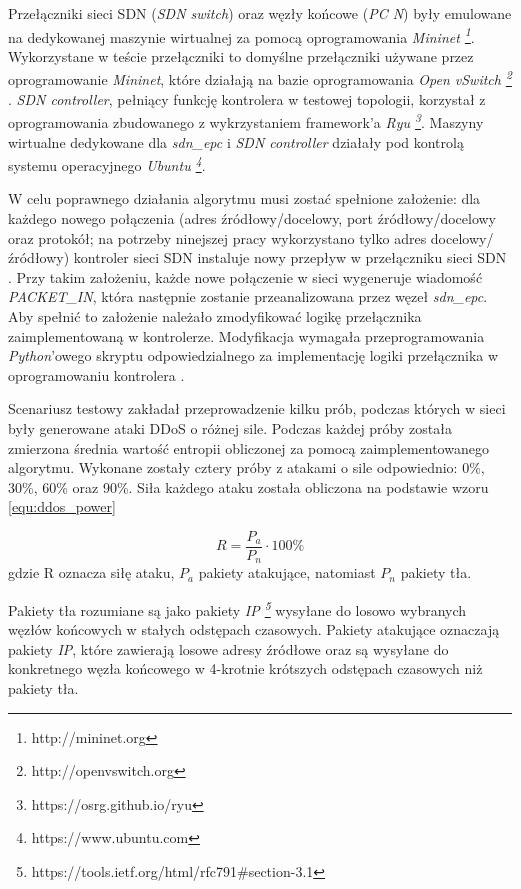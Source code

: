 Przełączniki sieci SDN (\textit{SDN switch}) oraz węzły końcowe (\textit{PC
  N}) były emulowane na dedykowanej maszynie wirtualnej za pomocą oprogramowania
\textit{Mininet \footnote{http://mininet.org}}. Wykorzystane w teście
przełączniki to domyślne przełączniki używane przez oprogramowanie
\textit{Mininet}, które działają na bazie oprogramowania
\textit{Open vSwitch \footnote{http://openvswitch.org}} \cite{mininetwiki}.
\textit{SDN controller}, pełniący funkcję kontrolera w testowej topologii,
korzystał z oprogramowania zbudowanego z wykrzystaniem framework'a
\textit{Ryu \footnote{https://osrg.github.io/ryu}}. Maszyny wirtualne dedykowane
dla \textit{sdn\_epc} i \textit{SDN controller} działały pod kontrolą systemu
operacyjnego \textit{Ubuntu \footnote{https://www.ubuntu.com}}.

W celu poprawnego działania algorytmu musi zostać spełnione założenie: dla
każdego nowego połączenia (adres źródłowy/docelowy, port źródłowy/docelowy oraz
protokół; na potrzeby ninejszej pracy wykorzystano tylko adres
docelowy/źródłowy) kontroler sieci SDN instaluje nowy przepływ w przełączniku
sieci SDN \cite{mainddosarticle}. Przy takim założeniu, każde nowe połączenie w
sieci wygeneruje wiadomość \textit{PACKET\_IN}, która następnie zostanie
przeanalizowana przez węzeł \textit{sdn\_epc}. Aby spełnić to założenie należało
zmodyfikować logikę przełącznika zaimplementowaną w kontrolerze. Modyfikacja
wymagała przeprogramowania \textit{Python}'owego skryptu odpowiedzialnego za
implementację logiki przełącznika w oprogramowaniu kontrolera \cite{ryupage}.

Scenariusz testowy zakładał przeprowadzenie kilku prób, podczas których w sieci
były generowane ataki DDoS o różnej sile. Podczas każdej próby została zmierzona
średnia wartość entropii obliczonej za pomocą zaimplementowanego algorytmu.
Wykonane zostały cztery próby z atakami o sile odpowiednio: 0\%, 30\%, 60\% oraz
90\%. Siła każdego ataku została obliczona na podstawie wzoru
\ref{equ:ddos_power} \cite{mainddosarticle}

\begin{equation}
R = \frac{P_{a}}{P_{n}} \cdot 100\%
\label{equ:ddos_power}
\end{equation}
gdzie R oznacza siłę ataku, $P_{a}$ pakiety atakujące, natomiast $P_{n}$ pakiety
tła.

Pakiety tła rozumiane są jako pakiety
\textit{IP \footnote{https://tools.ietf.org/html/rfc791\#section-3.1}} wysyłane
do losowo wybranych węzłów końcowych w stałych odstępach czasowych. Pakiety
atakujące oznaczają pakiety \textit{IP}, które zawierają losowe adresy źródłowe
oraz są wysyłane do konkretnego węzła końcowego w 4-krotnie krótszych odstępach
czasowych niż pakiety tła. 

